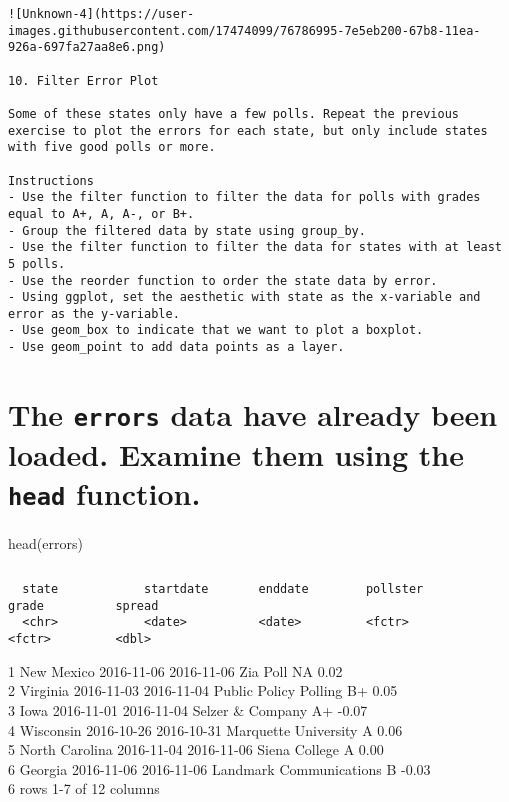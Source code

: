 \documentclass[
]{article}
\begin{document}
\begin{verbatim}
![Unknown-4](https://user-images.githubusercontent.com/17474099/76786995-7e5eb200-67b8-11ea-926a-697fa27aa8e6.png)

10. Filter Error Plot

Some of these states only have a few polls. Repeat the previous exercise to plot the errors for each state, but only include states with five good polls or more.

Instructions
- Use the filter function to filter the data for polls with grades equal to A+, A, A-, or B+.
- Group the filtered data by state using group_by.
- Use the filter function to filter the data for states with at least 5 polls.
- Use the reorder function to order the state data by error.
- Using ggplot, set the aesthetic with state as the x-variable and error as the y-variable.
- Use geom_box to indicate that we want to plot a boxplot.
- Use geom_point to add data points as a layer.
\end{verbatim}

\hypertarget{the-errors-data-have-already-been-loaded.-examine-them-using-the-head-function.-2}{%
\section{\texorpdfstring{The \texttt{errors} data have already been
loaded. Examine them using the \texttt{head}
function.}{The errors data have already been loaded. Examine them using the head function.}}\label{the-errors-data-have-already-been-loaded.-examine-them-using-the-head-function.-2}}

head(errors)

\begin{verbatim}
\end{verbatim}

\begin{verbatim}
  state            startdate       enddate        pollster                 grade          spread
  <chr>            <date>          <date>         <fctr>                   <fctr>         <dbl>
\end{verbatim}

1 New Mexico 2016-11-06 2016-11-06 Zia Poll NA 0.02\\
2 Virginia 2016-11-03 2016-11-04 Public Policy Polling B+ 0.05\\
3 Iowa 2016-11-01 2016-11-04 Selzer \& Company A+ -0.07\\
4 Wisconsin 2016-10-26 2016-10-31 Marquette University A 0.06\\
5 North Carolina 2016-11-04 2016-11-06 Siena College A 0.00\\
6 Georgia 2016-11-06 2016-11-06 Landmark Communications B -0.03\\
6 rows \textbar{} 1-7 of 12 columns
\end{document}
